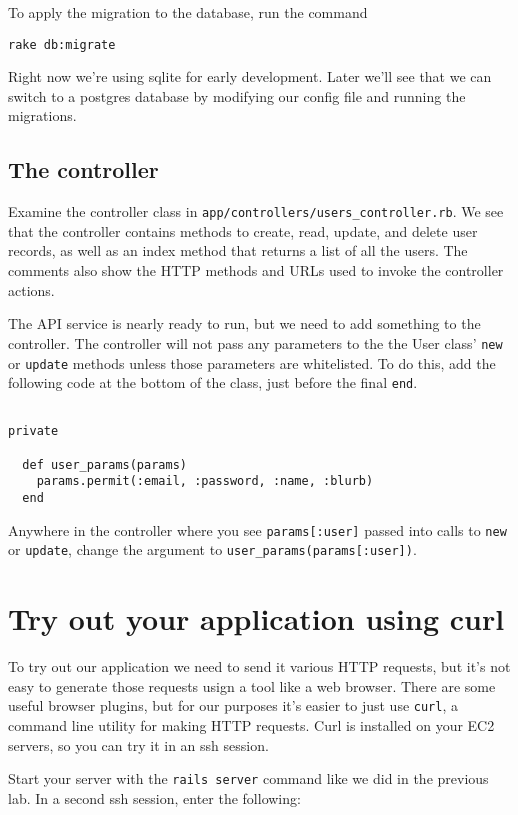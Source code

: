 \documentclass{article}
\begin{document}
To apply the migration to the database, run the command

\texttt{rake db:migrate}

Right now we're using sqlite for early development.  Later we'll see that we can switch to a postgres database by modifying our config file and running the migrations.

\subsection{The controller}
Examine the controller class in \texttt{app/controllers/users\_controller.rb}.  We see that the controller contains methods to create, read, update, and delete user records, as well as an index method that returns a list of all the users.  The comments also show the HTTP methods and URLs used to invoke the controller actions.

The API service is nearly ready to run, but we need to add something to the controller.  The controller will not pass any parameters to the the User class' \texttt{new} or \texttt{update} methods unless those parameters are whitelisted. To do this, add the following code at the bottom of the class, just before the final \texttt{end}.

\begin{verbatim}

private
  
  def user_params(params)
    params.permit(:email, :password, :name, :blurb)
  end
\end{verbatim}

Anywhere in the controller where you see \texttt{params[:user]} passed into calls to \texttt{new} or \texttt{update}, change the argument to \texttt{user\_params(params[:user])}.

\section{Try out your application using curl}
To try out our application we need to send it various HTTP requests, but it's not easy to generate those requests usign a tool like a web browser.  There are some useful browser plugins, but for our purposes it's easier to just use \texttt{curl}, a command line utility for making HTTP requests.  Curl is installed on your EC2 servers, so you can try it in an ssh session.

Start your server with the \texttt{rails server} command like we did in the previous lab. In a second ssh session, enter the following:
\end{document}
